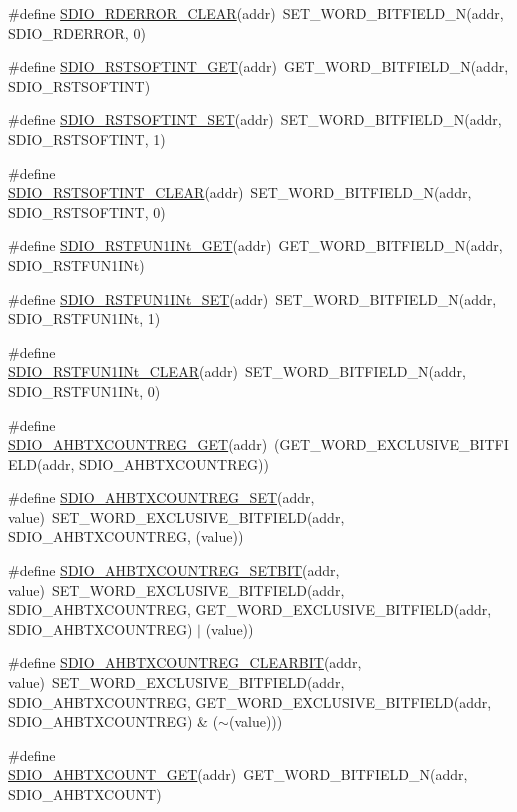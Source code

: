 \begin{DoxyCompactItemize}
\#define \hyperlink{a00570_ada192b1e46458d2ced6e79ed03943077}{SDIO\_\-RDERROR\_\-CLEAR}(addr)~SET\_\-WORD\_\-BITFIELD\_\-N(addr, SDIO\_\-RDERROR, 0)
\item 
\#define \hyperlink{a00570_a2267b35d8a8d6ec107e805bb2078ad00}{SDIO\_\-RSTSOFTINT\_\-GET}(addr)~GET\_\-WORD\_\-BITFIELD\_\-N(addr, SDIO\_\-RSTSOFTINT)
\item 
\#define \hyperlink{a00570_ab8e19c829ec6fe7b6f43466c97b2205e}{SDIO\_\-RSTSOFTINT\_\-SET}(addr)~SET\_\-WORD\_\-BITFIELD\_\-N(addr, SDIO\_\-RSTSOFTINT, 1)
\item 
\#define \hyperlink{a00570_a2a33f404f8d7e62bc44baba30aa481bc}{SDIO\_\-RSTSOFTINT\_\-CLEAR}(addr)~SET\_\-WORD\_\-BITFIELD\_\-N(addr, SDIO\_\-RSTSOFTINT, 0)
\item 
\#define \hyperlink{a00570_a22588cc0a45ea32a57de15b92f891253}{SDIO\_\-RSTFUN1INt\_\-GET}(addr)~GET\_\-WORD\_\-BITFIELD\_\-N(addr, SDIO\_\-RSTFUN1INt)
\item 
\#define \hyperlink{a00570_a2b953d731a4d97ab74500f65b496ccc9}{SDIO\_\-RSTFUN1INt\_\-SET}(addr)~SET\_\-WORD\_\-BITFIELD\_\-N(addr, SDIO\_\-RSTFUN1INt, 1)
\item 
\#define \hyperlink{a00570_a4fe41b8a6f1e7dada20edb2e4b89503c}{SDIO\_\-RSTFUN1INt\_\-CLEAR}(addr)~SET\_\-WORD\_\-BITFIELD\_\-N(addr, SDIO\_\-RSTFUN1INt, 0)
\item 
\#define \hyperlink{a00570_a7a71b5366371acf5506f42f3f989da9b}{SDIO\_\-AHBTXCOUNTREG\_\-GET}(addr)~(GET\_\-WORD\_\-EXCLUSIVE\_\-BITFIELD(addr, SDIO\_\-AHBTXCOUNTREG))
\item 
\#define \hyperlink{a00570_a8090bf8a0946932b4f045d0d3d35b95f}{SDIO\_\-AHBTXCOUNTREG\_\-SET}(addr, value)~SET\_\-WORD\_\-EXCLUSIVE\_\-BITFIELD(addr, SDIO\_\-AHBTXCOUNTREG, (value))
\item 
\#define \hyperlink{a00570_a66ef6a5ea6d654e409bcfa8e88d0b472}{SDIO\_\-AHBTXCOUNTREG\_\-SETBIT}(addr, value)~SET\_\-WORD\_\-EXCLUSIVE\_\-BITFIELD(addr, SDIO\_\-AHBTXCOUNTREG, GET\_\-WORD\_\-EXCLUSIVE\_\-BITFIELD(addr, SDIO\_\-AHBTXCOUNTREG) $|$ (value))
\item 
\#define \hyperlink{a00570_afd1962d3b2b1b1ea23a962b81af793ad}{SDIO\_\-AHBTXCOUNTREG\_\-CLEARBIT}(addr, value)~SET\_\-WORD\_\-EXCLUSIVE\_\-BITFIELD(addr, SDIO\_\-AHBTXCOUNTREG, GET\_\-WORD\_\-EXCLUSIVE\_\-BITFIELD(addr, SDIO\_\-AHBTXCOUNTREG) \& ($\sim$(value)))
\item 
\#define \hyperlink{a00570_a6d8311034beebb894ff187dfe3953fdf}{SDIO\_\-AHBTXCOUNT\_\-GET}(addr)~GET\_\-WORD\_\-BITFIELD\_\-N(addr, SDIO\_\-AHBTXCOUNT)
\item 

\end{DoxyCompactItemize}
